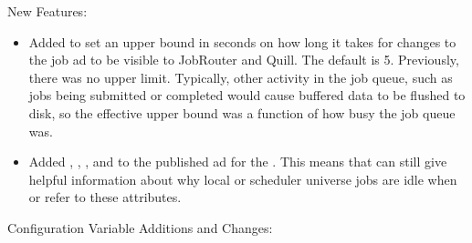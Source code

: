 \noindent New Features:

\begin{itemize}

\item Added  to set an
upper bound in seconds on how long it takes for changes to the job
ad to be visible to JobRouter and Quill.  The default is 5.
Previously, there was no upper limit.  Typically, other activity in
the job queue, such as jobs being submitted or completed would cause
buffered data to be flushed to disk, so the effective upper bound was
a function of how busy the job queue was.

\item Added , ,
, and 
to the published ad for the .  This means that
  can still give helpful information about
why local or scheduler universe jobs are idle when
 or
 refer to these attributes.

\end{itemize}

\noindent Configuration Variable Additions and Changes:


